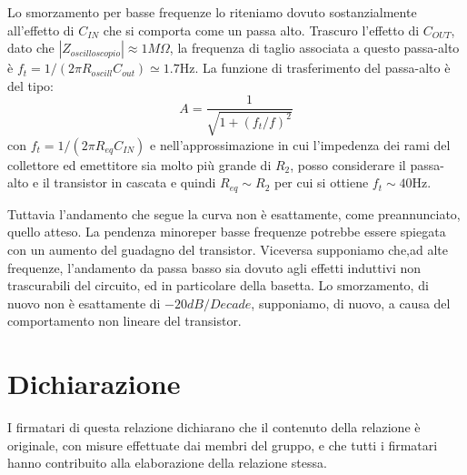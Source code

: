 \documentclass[10pt,a4paper]{article}
\begin{document}
Lo smorzamento per basse frequenze lo riteniamo dovuto sostanzialmente all'effetto di $C_{IN}$ che si comporta come un passa alto. Trascuro l'effetto di $C_{OUT}$, dato che $|Z_{oscilloscopio}|\approx1 M\Omega$, la frequenza di taglio associata a questo passa-alto è $f_t = 1 /(2\pi R_{oscill} C_{out}) \simeq 1.7 \si{\hertz}$.
La funzione di trasferimento del passa-alto  è del tipo:\[A=\frac{1}{\sqrt{1+(f_t/f)^2}}\] con $f_t=1/(2\pi R_{eq} C_{IN})$ e  nell'approssimazione in cui l'impedenza dei rami del collettore ed emettitore sia molto più grande di $R_2$, posso considerare il passa-alto e il transistor in cascata e quindi $R_{eq} \sim R_2$ per cui si ottiene $ f_t \sim 40 \si{\hertz}$.

Tuttavia l'andamento che segue la curva  non è esattamente, come preannunciato, quello atteso. La pendenza minoreper basse frequenze  potrebbe  essere spiegata  con un aumento del guadagno del transistor. 
Viceversa supponiamo che,ad  alte frequenze, l'andamento da passa basso sia dovuto agli effetti induttivi non trascurabili del circuito, ed in particolare della basetta.
Lo smorzamento, di nuovo non è esattamente di $-20 dB/Decade$, supponiamo, di nuovo, a causa del comportamento non lineare del transistor.

\section*{Dichiarazione}
I firmatari di questa relazione dichiarano che il contenuto della relazione \`e originale, con misure effettuate dai membri del gruppo, e che tutti i firmatari hanno contribuito alla elaborazione della relazione stessa.
\end{document}
